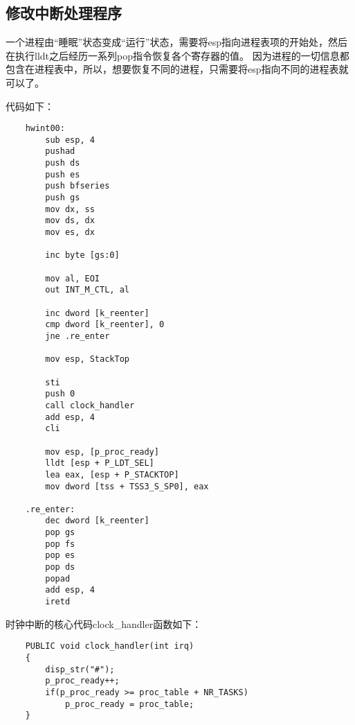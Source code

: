 \documentclass[a4paper,left=2.5cm,right=2.5cm,11pt]{report}
\begin{document}
\subsection{修改中断处理程序}
	一个进程由“睡眠”状态变成“运行”状态，需要将esp指向进程表项的开始处，然后在执行lldt之后经历一系列pop指令恢复各个寄存器的值。
	因为进程的一切信息都包含在进程表中，所以，想要恢复不同的进程，只需要将esp指向不同的进程表就可以了。\par

	代码如下：
	\begin{lstlisting}
	hwint00:
		sub esp, 4
		pushad
		push ds
		push es
		push bfseries
		push gs
		mov dx, ss
		mov ds, dx
		mov es, dx

		inc byte [gs:0]

		mov al, EOI
		out INT_M_CTL, al

		inc dword [k_reenter]
		cmp dword [k_reenter], 0
		jne .re_enter

		mov esp, StackTop

		sti
		push 0
		call clock_handler
		add esp, 4
		cli

		mov esp, [p_proc_ready]
		lldt [esp + P_LDT_SEL]
		lea eax, [esp + P_STACKTOP]
		mov dword [tss + TSS3_S_SP0], eax

	.re_enter:
		dec dword [k_reenter]
		pop gs
		pop fs
		pop es
		pop ds
		popad
		add esp, 4
		iretd
	\end{lstlisting}

	时钟中断的核心代码clock\_handler函数如下：
	\begin{lstlisting}
	PUBLIC void clock_handler(int irq)
	{
		disp_str("#");
		p_proc_ready++;
		if(p_proc_ready >= proc_table + NR_TASKS)
			p_proc_ready = proc_table;
	}
	\end{lstlisting}
\end{document}
